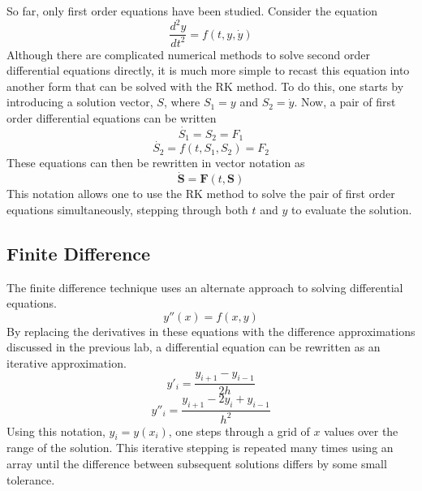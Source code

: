 \documentclass[12pt]{article}
\begin{document}
So far, only first order equations have been studied.  Consider the equation
\begin{equation}
\label{diff2}
\frac{d^2y}{dt^2} = f(t,y,\dot{y})
\end{equation}
Although there are complicated numerical methods to solve second order differential equations directly, it is much more simple to recast this equation into another form that can be solved with the RK method.  To do this, one starts by introducing a solution vector, $S$, where $S_1=y$ and $S_2=\dot{y}$.  Now, a pair of first order differential equations can be written
\begin{equation}
\label{S1dot}
\dot{S_1} =  S_2 = F_1
\end{equation}
\begin{equation}
\label{S2dot}
\dot{S_2} = f(t,S_1,S_2) = F_2
\end{equation}
These equations can then be rewritten in vector notation as
\begin{equation}
\label{Sdot}
\dot{\mathbf{S}} = \mathbf{F}(t,\mathbf{S})
\end{equation}
This notation allows one to use the RK method to solve the pair of first order equations simultaneously, stepping through both $t$ and $y$ to evaluate the solution.
\subsection{Finite Difference}
The finite difference technique uses an alternate approach to solving differential equations.  
\begin{equation}
\label{finitediff}
y''(x)=f(x,y)
\end{equation}
By replacing the derivatives in these equations with the difference approximations discussed in the previous lab, a differential equation can be rewritten as an iterative approximation.
\begin{equation}
\label{finitey'}
y'_i=\frac{y_{i+1}-y_{i-1}}{2h}
\end{equation}
\begin{equation}
\label{finitey''}
y''_i=\frac{y_{i+1}-2y_i+y_{i-1}}{h^2}
\end{equation}
Using this notation, $y_i=y(x_i)$, one steps through a grid of $x$ values over the range of the solution.  This iterative stepping is repeated many times using an array until the difference between subsequent solutions differs by some small tolerance. 
\end{document}
